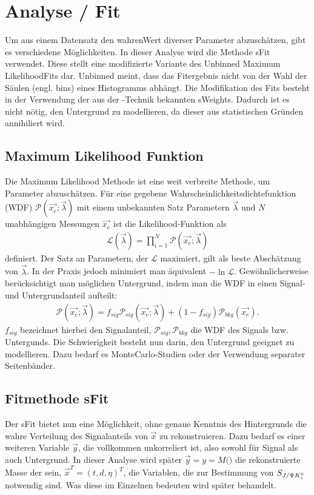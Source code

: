 \chapter{Analyse / Fit}
Um aus einem Datensatz den \glqq wahren\grqq Wert diverser Parameter abzuschätzen, gibt es verschiedene Möglichkeiten. In dieser Analyse wird die Methode sFit verwendet. Diese stellt eine modifizierte Variante des \glqq Unbinned Maximum Likelihood\grqq Fits dar. Unbinned meint, dass das Fitergebnis nicht von der Wahl der Säulen (engl. bins) eines Histogramms abhängt. Die Modifikation des Fits besteht in der Verwendung der aus der \SPlot-Technik bekannten sWeights. Dadurch ist es nicht nötig, den Untergrund zu modellieren, da dieser aus statistischen Gründen annihiliert wird.

\section{Maximum Likelihood Funktion}
Die Maximum Likelihood Methode ist eine weit verbreite Methode, um Parameter abzuschätzen. Für eine gegebene Wahrscheinlichkeitsdichtefunktion (WDF) $\mathcal{P}(\vec{x_e};\vec{\lambda})$ mit einem unbekannten Satz Parametern $\vec{\lambda}$ und $N$ unabhängigen Messungen $\vec{x_e}$ ist die Likelihood-Funktion als
\begin{align}
\mathcal{L}(\vec{\lambda}) = \prod_{i=1}^N \mathcal{P}(\vec{x_e};\vec{\lambda})
\end{align}
definiert. Der Satz an Parametern, der $\mathcal{L}$ maximiert, gilt als beste Abschätzung von $\vec{\lambda}$. In der Praxis jedoch minimiert man äquivalent $-\ln\mathcal{L}$. Gewöhnlicherweise berücksichtigt man möglichen Untergrund, indem man die WDF in einen Signal- und Untergrundanteil aufteilt:
\begin{align}
\mathcal{P}(\vec{x_e};\vec{\lambda}) = f_{sig}\mathcal{P}_{sig}(\vec{x_e};\vec{\lambda}) + (1-f_{sig})\mathcal{P}_{bkg}(\vec{x_e}). \label{eq:likelihood_sig_bkg}
\end{align}
$f_{sig}$ bezeichnet hierbei den Signalanteil, $\mathcal{P}_{sig}, \mathcal{P}_{bkg}$ die WDF des Signals bzw. Untergunds. Die Schwierigkeit besteht nun darin, den Untergrund geeignet zu modellieren. Dazu bedarf es MonteCarlo-Studien oder der Verwendung separater Seitenbänder. \cite{sfit}

\section{Fitmethode sFit} \label{kap:sfit}
Der sFit bietet nun eine Möglichkeit, ohne genaue Kenntnis des Hintergrunds die wahre Verteilung des Signalanteils von $\vec{x}$ zu rekonstruieren. Dazu bedarf es einer weiteren Variable $\vec{y}$, die vollkommen unkorreliert ist, also sowohl für Signal als auch Untergrund. In dieser Analyse wird später $\vec{y} = y = M($\Bd$)$ die rekonstruierte Masse der \Bd sein, $\vec{x}^T = (t,d,\eta)^T$, die Variablen, die zur Bestimmung von $S_{J/\Psi K_s^0}$ notwendig sind. Was diese im Einzelnen bedeuten wird später behandelt.

